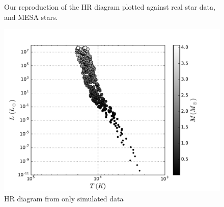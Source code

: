 \documentclass[10pt]{article}
\begin{document}
\begin{figure}[p]
\begin{centering}

\caption{Our reproduction of the HR diagram plotted against real star data, and MESA stars.}
\label{fig:HR}
\end{centering}
\end{figure}

\begin{figure}[p]
\begin{centering}
\includegraphics[width=\textwidth]{extra_hr.pdf}
\caption{HR diagram from only simulated data}
\label{fig:extraHR}
\end{centering}
\end{figure}
\end{document}
